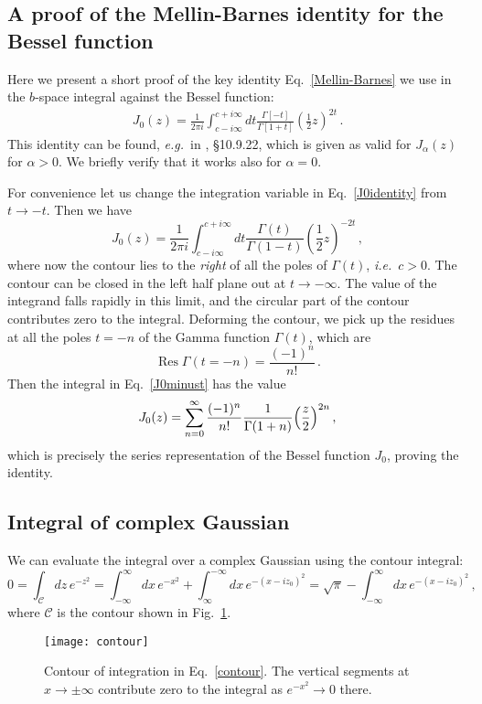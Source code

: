 \documentclass[a4,letterpaper,11pt]{article}
\newcommand{\be}{\begin{equation}}
\newcommand{\ee}{\end{equation}}
\newcommand{\bea}{\begin{eqnarray}}
\newcommand{\eea}{\end{eqnarray}}
\newcommand{\eg}{\emph{e.g.}~}
\newcommand{\ie}{\emph{i.e.}~}
\newcommand{\cC}{\mathcal{C}}
\newcommand{\eq}[1]{Eq.~\eqref{#1}}
\newcommand{\fig}[1]{Fig.~\ref{fig:#1}}
\DeclareMathOperator{\Res}{Res}
\begin{document}
\subsection{A proof of the Mellin-Barnes identity for the Bessel function}\label{app:proof}

Here we present a short proof of the key identity \eq{Mellin-Barnes} we use in the $b$-space integral against the Bessel function:
\bea
\label{J0identity}
J_0(z) = \frac{1}{2 \pi i}\int_{c-i \infty}^{c+i \infty} dt \frac{\Gamma[-t]}{\Gamma[1+t]} \left(\frac{1}{2} z \right)^{2t}  
\,.\eea
This identity can be found, \eg in \cite{NIST:DLMF}, \S 10.9.22, which is given as valid for $J_\alpha(z)$ for $\alpha>0$. We briefly verify that it works also for $\alpha=0$.

For convenience let us change the integration variable in \eq{J0identity} from $t\to -t$. Then we have
\be
\label{J0minust}
J_0(z) = \frac{1}{2 \pi i}\int_{c-i \infty}^{c+i \infty} dt \frac{\Gamma(t)}{\Gamma(1-t)} \left(\frac{1}{2} z \right)^{-2t}  \,,
\ee
where now the contour lies to the \emph{right} of all the poles of $\Gamma(t)$, \ie $c>0$. The contour can be closed in the left half plane out at $t\to -\infty$. The value of the integrand falls rapidly in this limit, and the circular part of the contour contributes zero to the integral. Deforming the contour, we pick up the residues at all the poles $t = -n$ of the Gamma function $\Gamma(t)$, which are
\be
\Res\Gamma(t=-n) = \frac{(-1)^n}{n!}\,.
\ee
Then the integral in \eq{J0minust} has the value
\be
J_0(z) =  \sum_{n=0}^\infty \frac{(-1)^n}{n!} \frac{1}{\Gamma(1+n)} \Bigl(\frac{z}{2}\Bigr)^{2n}\,,
\ee
which is precisely the series representation of the Bessel function $J_0$, proving the identity.



\subsection{Integral of complex Gaussian}

We can evaluate the integral over a complex Gaussian using the contour integral:
\be
\label{contour}
0 = \int_\cC dz\, e^{-z^2} = \int_{-\infty}^\infty dx \, e^{-x^2} + \int_{\infty}^{-\infty} dx \, e^{-(x - i z_0)^2} = \sqrt{\pi} - \int_{-\infty}^{\infty} dx \, e^{-(x - i z_0)^2} \,,
\ee
where $\cC$ is the contour shown in \fig{contour}.
\begin{figure}
\label{fig:contour}
\begin{center}
\texttt{[image: contour]}
\end{center}
\vspace{-2em}
\caption{Contour of integration in \eq{contour}. The vertical segments at $x\to\pm\infty$ contribute zero to the integral as $e^{-x^2}\to 0$ there.}
\end{figure}
\end{document}
